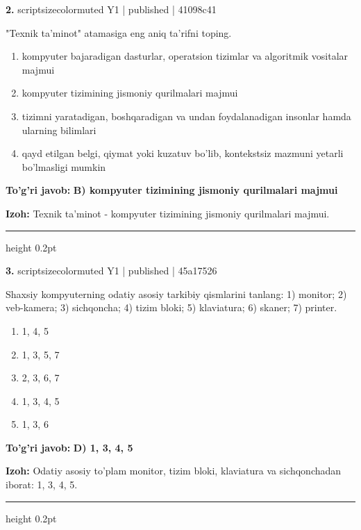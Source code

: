 \documentclass[10pt,a4paper]{article}
\begin{document}
{\bfseries\sffamily\color{ink} 2.} {scriptsizecolor{muted} Y1 | published | 41098c41}
\par
"Texnik ta'minot" atamasiga eng aniq ta'rifni toping.
\begin{enumerate}[label=\Alph*),leftmargin=9mm]
\item kompyuter bajaradigan dasturlar, operatsion tizimlar va algoritmik vositalar majmui
\item kompyuter tizimining jismoniy qurilmalari majmui
\item tizimni yaratadigan, boshqaradigan va undan foydalanadigan insonlar hamda ularning bilimlari
\item qayd etilgan belgi, qiymat yoki kuzatuv bo'lib, kontekstsiz mazmuni yetarli bo'lmasligi mumkin
\end{enumerate}
\begin{tcolorbox}[enhanced,breakable,colback=teal!4,colframe=teal!60!black,boxrule=0.45pt,arc=1.2mm,left=2.7mm,right=2.7mm,top=1.8mm,bottom=1.8mm,before skip=2mm,after skip=2mm]
{\bfseries\sffamily\color{teal}To'g'ri javob:} \textbf{B) kompyuter tizimining jismoniy qurilmalari majmui}
\par\smallskip
{\bfseries Izoh:} Texnik ta'minot - kompyuter tizimining jismoniy qurilmalari majmui.
\end{tcolorbox}
\vspace{2mm}\hrule height 0.2pt\vspace{3mm}

{\bfseries\sffamily\color{ink} 3.} {scriptsizecolor{muted} Y1 | published | 45a17526}
\par
Shaxsiy kompyuterning odatiy asosiy tarkibiy qismlarini tanlang: 1) monitor; 2) veb-kamera; 3) sichqoncha; 4) tizim bloki; 5) klaviatura; 6) skaner; 7) printer.
\begin{enumerate}[label=\Alph*),leftmargin=9mm]
\item 1, 4, 5
\item 1, 3, 5, 7
\item 2, 3, 6, 7
\item 1, 3, 4, 5
\item 1, 3, 6
\end{enumerate}
\begin{tcolorbox}[enhanced,breakable,colback=teal!4,colframe=teal!60!black,boxrule=0.45pt,arc=1.2mm,left=2.7mm,right=2.7mm,top=1.8mm,bottom=1.8mm,before skip=2mm,after skip=2mm]
{\bfseries\sffamily\color{teal}To'g'ri javob:} \textbf{D) 1, 3, 4, 5}
\par\smallskip
{\bfseries Izoh:} Odatiy asosiy to'plam monitor, tizim bloki, klaviatura va sichqonchadan iborat: 1, 3, 4, 5.
\end{tcolorbox}
\vspace{2mm}\hrule height 0.2pt\vspace{3mm}
\end{document}
